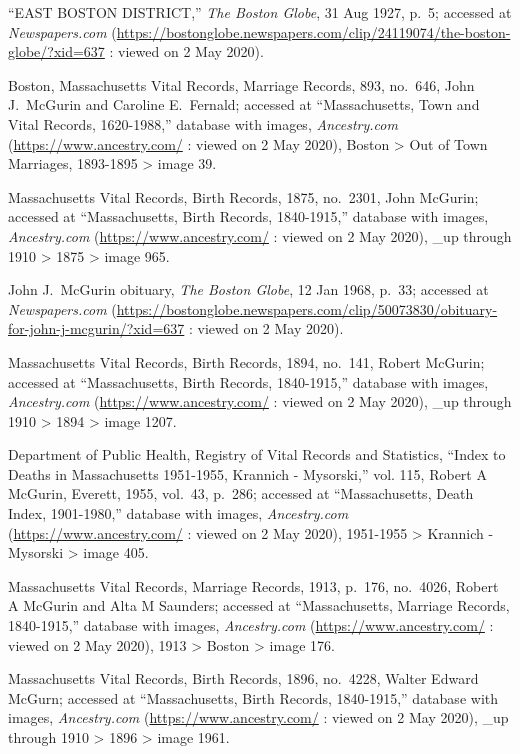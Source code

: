 \begin{thebibliography}{999}
	``EAST BOSTON DISTRICT,'' \textit{The Boston Globe}, 31 Aug 1927, p.\ 5; accessed at \textit{Newspapers.com} (\url{https://bostonglobe.newspapers.com/clip/24119074/the-boston-globe/?xid=637} : viewed on 2 May 2020).	
	
	Boston, Massachusetts Vital Records, Marriage Records, 893, no.\ 646, John J.\ McGurin and Caroline E.\ Fernald; accessed at ``Massachusetts, Town and Vital Records, 1620-1988,'' database with images, \textit{Ancestry.com} (\url{https://www.ancestry.com/} : viewed on 2 May 2020), Boston > Out of Town Marriages, 1893-1895 > image 39.
	
	Massachusetts Vital Records, Birth Records, 1875, no.\ 2301, John McGurin; accessed at ``Massachusetts, Birth Records, 1840-1915,'' database with images, \textit{Ancestry.com} (\url{https://www.ancestry.com/} : viewed on 2 May 2020), \_up through 1910 > 1875 > image 965.
	
	John J.\ McGurin obituary, \textit{The Boston Globe}, 12 Jan 1968, p.\ 33; accessed at \textit{Newspapers.com} (\url{https://bostonglobe.newspapers.com/clip/50073830/obituary-for-john-j-mcgurin/?xid=637} : viewed on 2 May 2020).
	
	Massachusetts Vital Records, Birth Records, 1894, no.\ 141, Robert McGurin; accessed at ``Massachusetts, Birth Records, 1840-1915,'' database with images, \textit{Ancestry.com} (\url{https://www.ancestry.com/} : viewed on 2 May 2020), \_up through 1910 > 1894 > image 1207.	
	
	Department of Public Health, Registry of Vital Records and Statistics, ``Index to Deaths in Massachusetts 1951-1955, Krannich - Mysorski,'' vol. 115, Robert A McGurin, Everett, 1955, vol.\ 43, p.\ 286; accessed at ``Massachusetts, Death Index, 1901-1980,'' database with images, \textit{Ancestry.com} (\url{https://www.ancestry.com/} : viewed on 2 May 2020), 1951-1955 > Krannich - Mysorski > image 405.
	
	Massachusetts Vital Records, Marriage Records, 1913, p.\ 176, no.\ 4026, Robert A McGurin and Alta M Saunders; accessed at ``Massachusetts, Marriage Records, 1840-1915,'' database with images, \textit{Ancestry.com} (\url{https://www.ancestry.com/} : viewed on 2 May 2020), 1913 > Boston > image 176.
	
	Massachusetts Vital Records, Birth Records, 1896, no.\ 4228, Walter Edward McGurn; accessed at ``Massachusetts, Birth Records, 1840-1915,'' database with images, \textit{Ancestry.com} (\url{https://www.ancestry.com/} : viewed on 2 May 2020), \_up through 1910 > 1896 > image 1961.
	

\end{thebibliography}
